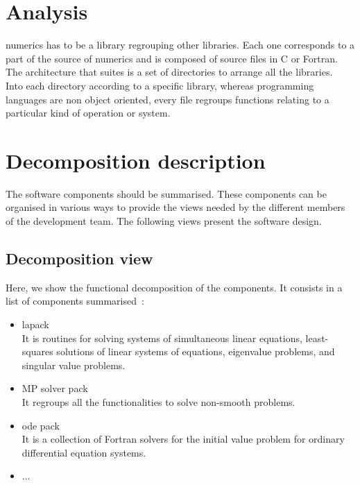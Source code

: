 \section{Analysis}
\ac{numerics} has to be a library regrouping other libraries. Each one corresponds to a part of the source of \ac{numerics} and is composed of source files in C or Fortran.\\
The architecture that suites is a set of directories to arrange all the libraries.\\
Into each directory according to a specific library, whereas programming languages are non object oriented, every file regroups functions relating to a particular kind of operation or system.


\section{Decomposition description}
The software components should be summarised. These components can be organised in various ways to provide the
views needed by the different members of the development team. The following views present the software
design.

\subsection{Decomposition view}
Here, we show the functional decomposition of the components. It consists in a list of components summarised~:
 
\begin{itemize}
		\item \ac{lapack}\\
		It is routines for solving systems of simultaneous linear equations, least-squares solutions of linear systems of equations, eigenvalue problems, and singular value problems.

        \item MP solver pack\\
		It regroups all the functionalities to solve non-smooth problems.
		
        \item \ac{ode} pack\\
		It is a collection of Fortran solvers for the initial value problem for ordinary differential equation systems.

        \item ...\\
\end{itemize}


